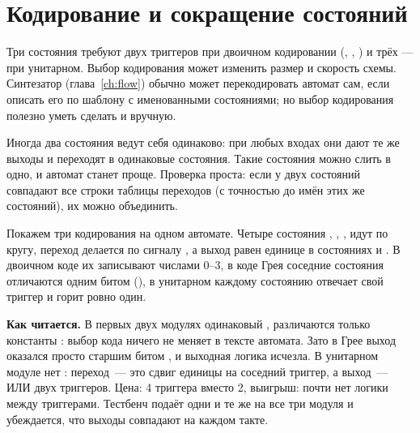 \section{Кодирование и сокращение состояний}

Три состояния требуют двух триггеров при двоичном кодировании
(, , ) и трёх --- при унитарном. Выбор кодирования
может изменить размер и скорость схемы. Синтезатор (глава~\ref{ch:flow})
обычно может перекодировать автомат сам, если описать его по шаблону с
именованными состояниями; но выбор кодирования полезно уметь сделать и
вручную.

Иногда два состояния ведут себя одинаково: при любых входах они дают те же
выходы и переходят в одинаковые состояния. Такие состояния можно слить в
одно, и автомат станет проще. Проверка проста: если у двух состояний
совпадают все строки таблицы переходов (с точностью до имён этих же
состояний), их можно объединить.

Покажем три кодирования на одном автомате. Четыре состояния , ,
,  идут по кругу, переход делается по сигналу , а
выход  равен единице в состояниях  и . В двоичном
коде их записывают числами 0--3, в коде Грея соседние состояния отличаются
одним битом (), в унитарном каждому состоянию отвечает
свой триггер и горит ровно один.


\textbf{Как читается.} В первых двух модулях одинаковый , различаются
только константы : выбор кода ничего не меняет в тексте
автомата. Зато в Грее выход оказался просто старшим битом , и
выходная логика исчезла. В унитарном модуле нет : переход~--- это
сдвиг единицы на соседний триггер, а выход~--- ИЛИ двух триггеров. Цена:
4 триггера вместо 2, выигрыш: почти нет логики между триггерами. Тестбенч
 подаёт одни и те же  на все три модуля и
убеждается, что выходы совпадают на каждом такте.

